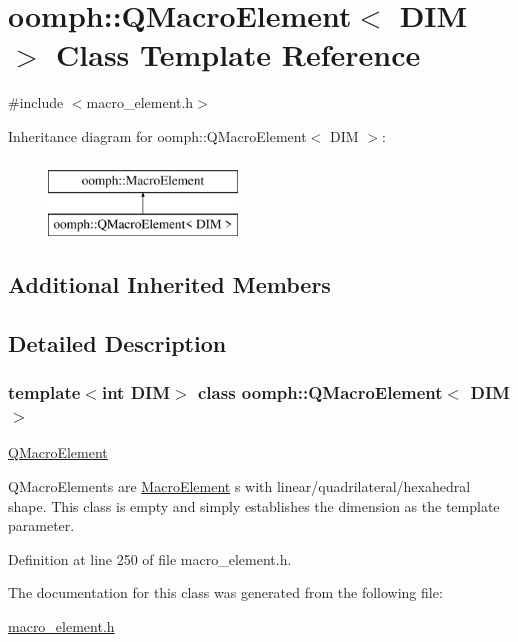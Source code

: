 \hypertarget{classoomph_1_1QMacroElement}{}\section{oomph\+:\+:Q\+Macro\+Element$<$ D\+IM $>$ Class Template Reference}
\label{classoomph_1_1QMacroElement}


{\ttfamily \#include $<$macro\+\_\+element.\+h$>$}

Inheritance diagram for oomph\+:\+:Q\+Macro\+Element$<$ D\+IM $>$\+:\begin{figure}[H]
\begin{center}
\leavevmode
\includegraphics[height=2.000000cm]{classoomph_1_1QMacroElement}
\end{center}
\end{figure}
\subsection*{Additional Inherited Members}


\subsection{Detailed Description}
\subsubsection*{template$<$int D\+IM$>$\newline
class oomph\+::\+Q\+Macro\+Element$<$ D\+I\+M $>$}

\hyperlink{classoomph_1_1QMacroElement}{Q\+Macro\+Element}

Q\+Macro\+Elements are \hyperlink{classoomph_1_1MacroElement}{Macro\+Element} s with linear/quadrilateral/hexahedral shape. This class is empty and simply establishes the dimension as the template parameter. 

Definition at line 250 of file macro\+\_\+element.\+h.



The documentation for this class was generated from the following file\+:\begin{DoxyCompactItemize}
\item 
\hyperlink{macro__element_8h}{macro\+\_\+element.\+h}\end{DoxyCompactItemize}
